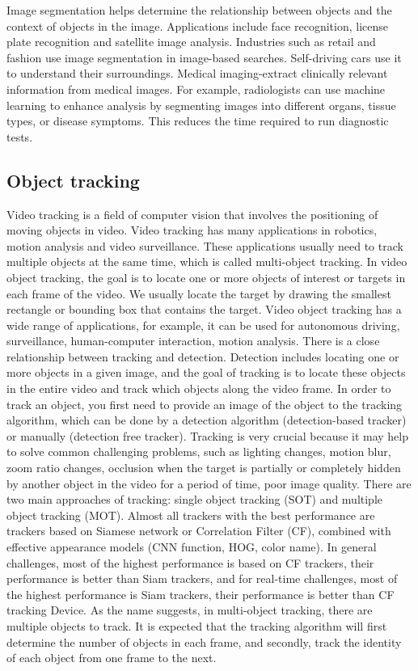 Image segmentation helps determine the relationship between objects and the context of objects in the image. Applications include face recognition, license plate recognition and satellite image analysis. Industries such as retail and fashion use image segmentation in image-based searches. Self-driving cars use it to understand their surroundings. Medical imaging-extract clinically relevant information from medical images. For example, radiologists can use machine learning to enhance analysis by segmenting images into different organs, tissue types, or disease symptoms. This reduces the time required to run diagnostic tests.
\subsection{Object tracking}
Video tracking is a field of computer vision that involves the positioning of moving objects in video. Video tracking has many applications in robotics, motion analysis and video surveillance. These applications usually need to track multiple objects at the same time, which is called multi-object tracking. In video object tracking, the goal is to locate one or more objects of interest or targets in each frame of the video. We usually locate the target by drawing the smallest rectangle or bounding box that contains the target. Video object tracking has a wide range of applications, for example, it can be used for autonomous driving, surveillance, human-computer interaction, motion analysis. There is a close relationship between tracking and detection. Detection includes locating one or more objects in a given image, and the goal of tracking is to locate these objects in the entire video and track which objects along the video frame. In order to track an object, you first need to provide an image of the object to the tracking algorithm, which can be done by a detection algorithm (detection-based tracker) or manually (detection free tracker). Tracking is very crucial because it may help to solve common challenging problems, such as lighting changes, motion blur, zoom ratio changes, occlusion when the target is partially or completely hidden by another object in the video for a period of time, poor image quality. There are two main approaches of tracking: single object tracking (SOT) and multiple object tracking (MOT). Almost all trackers with the best performance are trackers based on Siamese network or Correlation Filter (CF), combined with effective appearance models (CNN function, HOG, color name). In general challenges, most of the highest performance is based on CF trackers, their performance is better than Siam trackers, and for real-time challenges, most of the highest performance is Siam trackers, their performance is better than CF tracking Device. As the name suggests, in multi-object tracking, there are multiple objects to track. It is expected that the tracking algorithm will first determine the number of objects in each frame, and secondly, track the identity of each object from one frame to the next.
